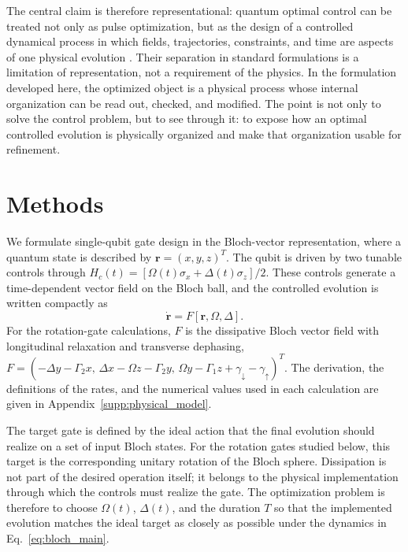 \documentclass[aps,prx,reprint,superscriptaddress,nofootinbib,longbibliography,floatfix,showkeys]{revtex4-2}
\newcommand{\rr}{\bm r}
\newcommand{\appsecref}[1]{Appendix~\hyperref[#1]{\ref*{#1}}}
\begin{document}
The central claim is therefore representational: quantum optimal control can
be treated not only as pulse optimization, but as the design of a controlled
dynamical process in which fields, trajectories, constraints, and time are
aspects of one physical evolution
\cite{Peirce1988QuantumOCT,Brif2010QuantumControlReview,Koch2022QuantumTechnologies}.
Their separation in standard formulations is a limitation of representation,
not a requirement of the physics.  In the formulation developed here, the
optimized object is a physical process whose internal organization can be
read out, checked, and modified.  The point is not only to solve the control
problem, but to see through it: to expose how an optimal controlled evolution
is physically organized and make that organization usable for refinement.


\section{Methods}


We formulate single-qubit gate design in the Bloch-vector representation,
where a quantum state is described by $\rr=(x,y,z)^T$.  The qubit is driven
by two tunable controls through
$H_c(t)=[\Omega(t)\sigma_x+\Delta(t)\sigma_z]/2$.  These controls generate a
time-dependent vector field on the Bloch ball, and the controlled evolution
is written compactly as
\begin{equation}
    \dot{\rr}=F[\rr,\Omega,\Delta].
    \label{eq:bloch_main}
\end{equation}
For the rotation-gate calculations, $F$ is the dissipative Bloch vector
field with longitudinal relaxation and transverse dephasing,
$F=(-\Delta y-\Gamma_2x,\,\Delta x-\Omega z-\Gamma_2y,\,
\Omega y-\Gamma_1z+\gamma_\downarrow-\gamma_\uparrow)^T$.  The derivation,
the definitions of the rates, and the numerical values used in each
calculation are given in \appsecref{supp:physical_model}.

The target gate is defined by the ideal action that the final evolution
should realize on a set of input Bloch states.  For the rotation gates
studied below, this target is the corresponding unitary rotation of the
Bloch sphere.  Dissipation is not part of the desired operation itself; it
belongs to the physical implementation through which the controls must
realize the gate.  The optimization problem is therefore to choose
$\Omega(t)$, $\Delta(t)$, and the duration $T$ so that the implemented
evolution matches the ideal target as closely as possible under the dynamics
in Eq.~\eqref{eq:bloch_main}.
\end{document}
